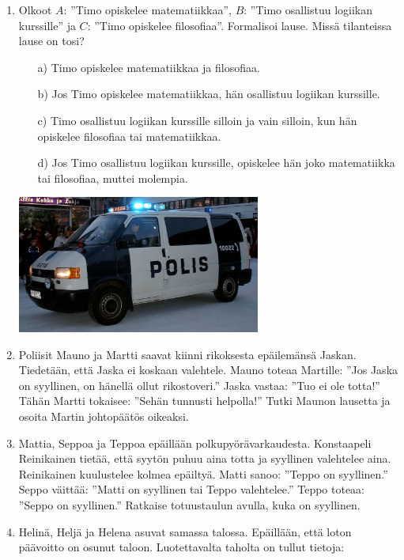 \begin{enumerate}
\item
Olkoot $A$: ''Timo opiskelee matematiikkaa'', $B$: ''Timo osallistuu logiikan kurssille'' ja $C$: ''Timo opiskelee filosofiaa''. Formalisoi lause. Missä tilanteissa lause on tosi?
\begin{itemize}
\item[a)] Timo opiskelee matematiikkaa ja filosofiaa.
\item[b)] Jos Timo opiskelee matematiikkaa, hän osallistuu logiikan kurssille.
\item[c)] Timo osallistuu logiikan kurssille silloin ja vain silloin, kun hän opiskelee filosofiaa tai matematiikkaa.
\item[d)] Jos Timo osallistuu logiikan kurssille, opiskelee hän joko matematiikka tai filosofiaa, muttei molempia.
\end{itemize}

\bigskip

\begin{center}
\includegraphics[width=8cm]{pictures/kuvitus/Finnish_police_car}
\end{center}

\item Poliisit Mauno ja Martti saavat kiinni rikoksesta epäilemänsä Jaskan. Tiedetään, että Jaska ei koskaan valehtele. Mauno toteaa Martille: ''Jos Jaska on syyllinen, on hänellä ollut rikostoveri.'' Jaska vastaa: ''Tuo ei ole totta!'' Tähän Martti tokaisee: ''Sehän tunnusti helpolla!'' Tutki Maunon lausetta ja osoita Martin johtopäätös oikeaksi.

\item Mattia, Seppoa ja Teppoa epäillään polkupyörävarkaudesta. Konstaapeli Reinikainen tietää, että syytön puhuu aina totta ja syyllinen valehtelee aina. Reinikainen kuulustelee kolmea epäiltyä. Matti sanoo: ''Teppo on syyllinen.'' Seppo väittää: ''Matti on syyllinen tai Teppo valehtelee.'' Teppo toteaa: ''Seppo on syyllinen.'' Ratkaise totuustaulun avulla, kuka on syyllinen. 

\item Helinä, Heljä ja Helena asuvat samassa talossa. Epäillään, että loton päävoitto on osunut taloon. Luotettavalta taholta on tullut tietoja:


\end{enumerate}
